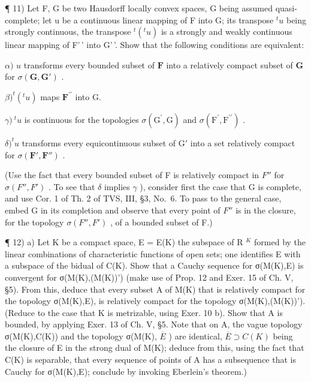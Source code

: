 ¶ 11) Let F, G be two Hausdorff locally convex spaces, G being assumed quasi-complete; let u be a continuous linear mapping of F into G; its transpose \(^{t}u\) being strongly continuous, the transpose \(^{t}(^{t}u)\) is a strongly and weakly continuous linear mapping of F'\,' into G'\,'. Show that the following conditions are equivalent:

\(\alpha)\) \(u\) transforms every bounded subset of \(\mathbf{F}\) into a relatively compact subset of \(\mathbf{G}\) for \(\sigma(\mathbf{G},\mathbf{G}')\) .

\(\beta)^{t}(^{t}u)\) maps \(\mathbf{F}^{\prime \prime}\) into G.

\(\gamma)\ ^{t}u\) is continuous for the topologies \(\sigma(\mathrm{G}^{\prime},\mathrm{G})\) and \(\sigma(\mathrm{F}^{\prime},\mathrm{F}^{\prime\prime})\) .

\(\delta)^{t}u\) transforms every equicontinuous subset of \(\mathrm{G}'\) into a set relatively compact for \(\sigma (\mathbf{F}',\mathbf{F}'')\) .

(Use the fact that every bounded subset of F is relatively compact in \(F''\) for \(\sigma(F'', F')\) . To see that \(\delta\) implies \(\gamma\) ), consider first the case that G is complete, and use Cor. 1 of Th. 2 of TVS, III, §3, No.~6. To pass to the general case, embed G in its completion and observe that every point of \(F''\) is in the closure, for the topology \(\sigma(F'', F')\) , of a bounded subset of F.)

¶ 12) a) Let K be a compact space, E = E(K) the subspace of R \(^{K}\) formed by the linear combinations of characteristic functions of open sets; one identifies E with a subspace of the bidual of C(K). Show that a Cauchy sequence for σ(M(K),E) is convergent for σ(M(K),(M(K))') (make use of Prop. 12 and Exer. 15 of Ch. V, §5). From this, deduce that every subset A of M(K) that is relatively compact for the topology σ(M(K),E), is relatively compact for the topology σ(M(K),(M(K))'). (Reduce to the case that K is metrizable, using Exer. 10 b). Show that A is bounded, by applying Exer. 13 of Ch. V, §5. Note that on A, the vague topology σ(M(K),C(K)) and the topology σ(M(K), \(\overline{E}\) ) are identical, \(\overline{E} \supset C(K)\) being the closure of E in the strong dual of M(K); deduce from this, using the fact that C(K) is separable, that every sequence of points of A has a subsequence that is Cauchy for σ(M(K),E); conclude by invoking Eberlein's theorem.)

